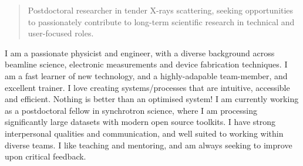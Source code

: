 \documentclass[10pt,a4paper,ragged2e,withhyper]{altacv}
\begin{document}
\begin{paracol}{2}
        \vspace{-4em}
		{\textalignment
            \begin{quote}
            	Postdoctoral researcher in tender X-rays scattering, seeking opportunities to passionately contribute to long-term scientific research in technical and user-focused roles.
            \end{quote}
        \vspace{0.5em}
		I am a passionate physicist and engineer, with a diverse background across beamline science, electronic measurements and device fabrication techniques. I am a fast learner of new technology, and a highly-adapable team-member, and excellent trainer. I love creating systems/processes that are intuitive, accessible and efficient. Nothing is better than an optimised system! I am currently working as a postdoctoral fellow in synchrotron science, where I am processing significantly large datasets with modern open source toolkits. I have strong interpersonal qualities and communication, and well suited to working within diverse teams. I like teaching and mentoring, and am always seeking to improve upon critical feedback.
		}
        
			

\end{paracol}
\end{document}
